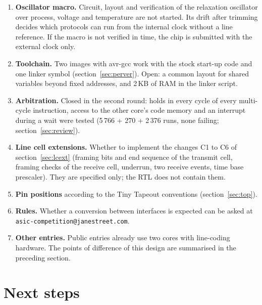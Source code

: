 \documentclass[10pt,a4paper]{article}
\begin{document}
\begin{enumerate}
per bit work on the top level with an oscillator model (section~\ref{sec:oscusb}).
\item \textbf{Oscillator macro.} Circuit, layout and verification of the relaxation oscillator over process,
voltage and temperature are not started. Its drift after trimming decides which protocols can run from the
internal clock without a line reference. If the macro is not verified in time, the chip is submitted with the
external clock only.
\item \textbf{Toolchain.} Two images with avr-gcc work with the stock start-up code and one linker symbol (section~\ref{sec:perver}). Open: a common layout for shared variables beyond fixed addresses, and 2\,KB of RAM in the linker script.
\item \textbf{Arbitration.} Closed in the second round: holds in every cycle of every multi-cycle instruction, access to the other core's code memory and an interrupt during a wait were tested (5\,766 + 270 + 2\,376 runs, none failing; section~\ref{sec:review}).
\item \textbf{Line cell extensions.} Whether to implement the changes C1 to C6 of section~\ref{sec:lcext} (framing bits and end sequence of the transmit cell, framing checks of the receive cell, underrun, two receive events, time base prescaler). They are specified only; the RTL does not contain them.
\item \textbf{Pin positions} according to the Tiny Tapeout conventions (section~\ref{sec:top}).
\item \textbf{Rules.} Whether a conversion between interfaces is expected can be asked at
\\ \texttt{asic-competition@janestreet.com}.
\item \textbf{Other entries.} Public entries already use two cores with line-coding hardware. The points of
difference of this design are summarised in the preceding section.
\end{enumerate}

\section{Next steps}
\end{document}
